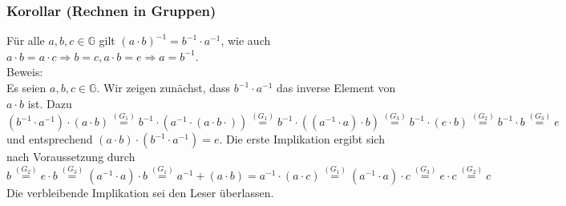 \subsubsection{Korollar (Rechnen in Gruppen)}
Für alle $a,b,c\in\mathbb{G}$ gilt $(a\cdot b)^{-1}=b^{-1}\cdot a^{-1}$, wie auch $a\cdot b=a\cdot c\Rightarrow b=c,a\cdot b=e\Rightarrow a=b^{-1}$.\\
Beweis:\\
Es seien $a,b,c\in\mathbb{G}$.  Wir zeigen zunächst, dass $b^{-1}\cdot a^{-1}$ das inverse Element von $a\cdot b$ ist.  Dazu 
\[(b^{-1}\cdot a^{-1})\cdot(a\cdot b)\stackrel{(G_1)}{=} b^{-1}\cdot(a^{-1}\cdot(a\cdot b\cdot))\stackrel{(G_1)}{=}b^{-1}\cdot((a^{-1}\cdot a)\cdot b)\stackrel{(G_3)}{=} b^{-1}\cdot(e\cdot b)\stackrel{(G_2)}{=}b^{-1}\cdot b\stackrel{(G_3)}{=}e\]
und entsprechend $(a\cdot b)\cdot(b^{-1}\cdot a^{-1})=e$.  Die erste Implikation ergibt sich nach Voraussetzung durch 
\[b\stackrel{(G_2)}{=}e\cdot b\stackrel{(G_3)}{=}(a^{-1}\cdot a)\cdot b\stackrel{(G_1)}{=}a^{-1}+(a\cdot b)=a^{-1}\cdot(a\cdot c)\stackrel{(G_1)}{=}(a^{-1}\cdot a)\cdot c\stackrel{(G_3)}{=}e\cdot c\stackrel{(G_2)}{=}c\]
Die verbleibende Implikation sei den Leser überlassen.
